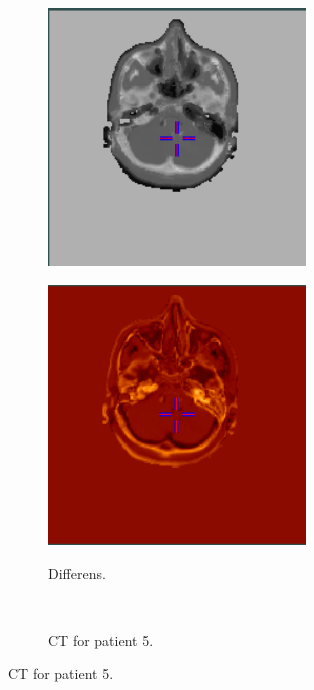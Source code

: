 \begin{figure}
\begin{subfigure}[b]{0.3\textwidth}
        \includegraphics[width=0.75\textwidth]{colager/loocv_ct/loocv_010960_sct.png}
        \label{col:loocv_ct_pat4_sct}
    \end{subfigure}\hfill
    \begin{subfigure}[b]{0.3\textwidth}
        \caption{Differens.}
        \includegraphics[width=0.75\textwidth]{colager/loocv_ct/loocv_010960_sub.png}
        \label{col:loocv_ct_pat4_sub}
    \end{subfigure}\\
    \begin{subfigure}[b]{0.3\textwidth}
        \caption{CT for patient 5.}

\end{subfigure}
\end{figure}
